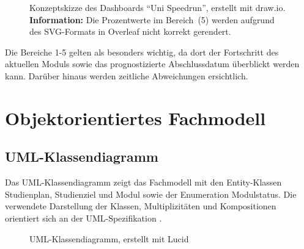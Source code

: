 \documentclass[11pt,a4paper]{article}
\begin{document}
\begin{figure}[H]
    \centering

    

    \caption{Konzeptskizze des Dashboards \enquote{Uni Speedrun}, erstellt mit draw.io.
    \textbf{Information:} Die Prozentwerte im Bereich~(5) werden aufgrund des SVG-Formats in Overleaf nicht korrekt gerendert.}
    \label{fig:dashboard}
\end{figure}

 

%






Die Bereiche 1-5 gelten als besonders wichtig, da dort der Fortschritt des aktuellen Moduls sowie das prognostizierte Abschlussdatum überblickt werden kann. Darüber hinaus werden zeitliche Abweichungen ersichtlich. 



\section{Objektorientiertes Fachmodell}

\subsection{UML-Klassendiagramm}

Das UML-Klassendiagramm zeigt das Fachmodell mit den Entity-Klassen
Studienplan, Studienziel und Modul sowie der Enumeration Modulstatus.
Die verwendete Darstellung der Klassen, Multiplizitäten und Kompositionen
orientiert sich an der UML-Spezifikation \cite{omg-uml}.


\begin{figure}[htbp]
    \centering
    
    \caption{UML-Klassendiagramm, erstellt mit Lucid}
    \label{fig:uml}
\end{figure}
\end{document}
